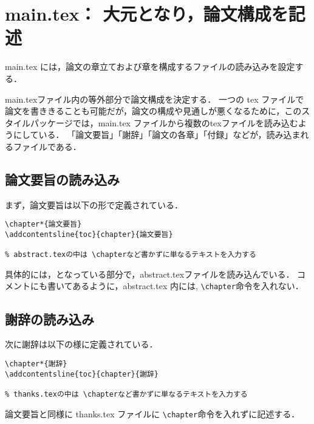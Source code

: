 \section{main.tex： 大元となり，論文構成を記述}
main.tex には，論文の章立ておよび章を構成するファイルの読み込みを設定する．

main.texファイル内の等外部分で論文構成を決定する．
一つの tex ファイルで論文を書ききることも可能だが，論文の構成や見通しが悪くなるために，このスタイルパッケージでは，main.tex ファイルから複数のtexファイルを読み込むようにしている．
「論文要旨」「謝辞」「論文の各章」「付録」などが，読み込まれるファイルである．

\subsection{論文要旨の読み込み}
まず，論文要旨は以下の形で定義されている．
\begin{breakbox}
{\small
\begin{verbatim}
\chapter*{論文要旨}
\addcontentsline{toc}{chapter}{論文要旨}

% abstract.texの中は \chapterなど書かずに単なるテキストを入力する
\end{verbatim}
}
\end{breakbox}
具体的には，\verb++となっている部分で，abstract.texファイルを読み込んでいる．
コメントにも書いてあるように，abstract.tex 内には, \verb+\chapter+命令を入れない．

\subsection{謝辞の読み込み}
次に謝辞は以下の様に定義されている．
\begin{breakbox}
{\small
\begin{verbatim}
\chapter*{謝辞}
\addcontentsline{toc}{chapter}{謝辞}

% thanks.texの中は \chapterなど書かずに単なるテキストを入力する
\end{verbatim}
}
\end{breakbox}
論文要旨と同様に thanks.tex ファイルに \verb+\chapter+命令を入れずに記述する．

